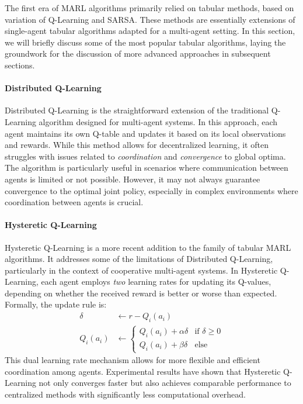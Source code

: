  The first era of \ac{MARL} 
  algorithms primarily relied on tabular methods, based on variation of Q-Learning and SARSA. 
  These methods are essentially extensions of single-agent tabular algorithms adapted for a multi-agent setting. 
  In this section, we will briefly discuss some of the most popular tabular algorithms, 
  laying the groundwork for the discussion of more advanced approaches in subsequent sections.
 
 \paragraph*{Distributed Q-Learning}
 
 Distributed Q-Learning is the straightforward extension of the traditional Q-Learning algorithm designed for multi-agent systems. 
  In this approach, each agent maintains its own Q-table and updates it based on its local observations and rewards. While this method allows for decentralized learning, 
  it often struggles with issues related to \emph{coordination} and \emph{convergence} to global optima. The algorithm is particularly useful in scenarios where communication between agents is limited or not possible.
  However, it may not always guarantee convergence to the optimal joint policy, 
  especially in complex environments where coordination between agents is crucial.
 
 \paragraph*{Hysteretic Q-Learning}
 
 Hysteretic Q-Learning is a more recent addition to the family of tabular MARL algorithms. 
  It addresses some of the limitations of Distributed Q-Learning, 
  particularly in the context of cooperative multi-agent systems. 
  In Hysteretic Q-Learning, each agent employs \emph{two} learning rates for updating its Q-values, 
  depending on whether the received reward is better or worse than expected. 
  Formally, the update rule is:
  \begin{align*}
    \delta & \leftarrow r - Q_i(a_i) \\
    Q_i(a_i) & \leftarrow 
    \begin{cases} 
    Q_i(a_i) + \alpha \delta & \text{if } \delta \geq 0 \\
    Q_i(a_i) + \beta \delta & \text{else}
    \end{cases}
  \end{align*}
  This dual learning rate mechanism allows for more flexible and efficient coordination among agents. 
  Experimental results have shown that Hysteretic Q-Learning not only converges faster but also achieves comparable performance to centralized methods with significantly less computational overhead.

